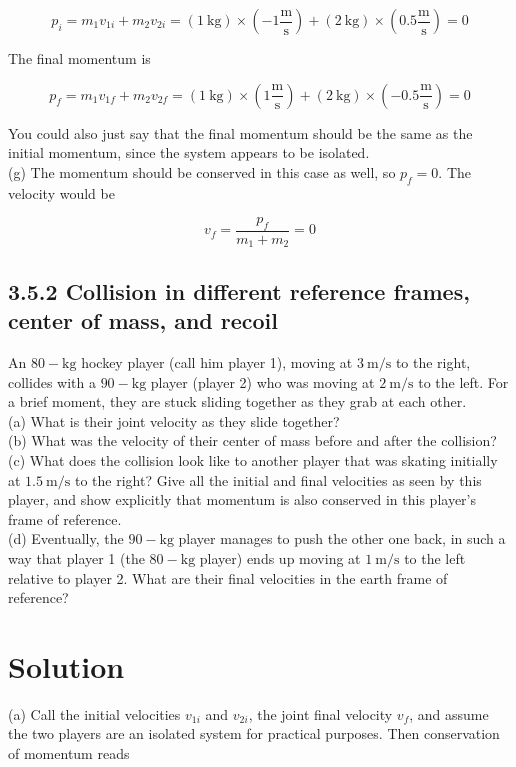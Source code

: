 \documentclass[10pt]{article}
\begin{document}
$$
p_{i}=m_{1} v_{1 i}+m_{2} v_{2 i}=(1 \mathrm{~kg}) \times\left(-1 \frac{\mathrm{m}}{\mathrm{s}}\right)+(2 \mathrm{~kg}) \times\left(0.5 \frac{\mathrm{m}}{\mathrm{s}}\right)=0
$$

The final momentum is

$$
p_{f}=m_{1} v_{1 f}+m_{2} v_{2 f}=(1 \mathrm{~kg}) \times\left(1 \frac{\mathrm{m}}{\mathrm{s}}\right)+(2 \mathrm{~kg}) \times\left(-0.5 \frac{\mathrm{m}}{\mathrm{s}}\right)=0
$$

You could also just say that the final momentum should be the same as the initial momentum, since the system appears to be isolated.\\
(g) The momentum should be conserved in this case as well, so $p_{f}=0$. The velocity would be

$$
v_{f}=\frac{p_{f}}{m_{1}+m_{2}}=0
$$

\subsection*{3.5.2 Collision in different reference frames, center of mass, and recoil}
An $80-\mathrm{kg}$ hockey player (call him player 1), moving at $3 \mathrm{~m} / \mathrm{s}$ to the right, collides with a $90-\mathrm{kg}$ player (player 2) who was moving at $2 \mathrm{~m} / \mathrm{s}$ to the left. For a brief moment, they are stuck sliding together as they grab at each other.\\
(a) What is their joint velocity as they slide together?\\
(b) What was the velocity of their center of mass before and after the collision?\\
(c) What does the collision look like to another player that was skating initially at $1.5 \mathrm{~m} / \mathrm{s}$ to the right? Give all the initial and final velocities as seen by this player, and show explicitly that momentum is also conserved in this player's frame of reference.\\
(d) Eventually, the $90-\mathrm{kg}$ player manages to push the other one back, in such a way that player 1 (the $80-\mathrm{kg}$ player) ends up moving at $1 \mathrm{~m} / \mathrm{s}$ to the left relative to player 2. What are their final velocities in the earth frame of reference?

\section*{Solution}
(a) Call the initial velocities $v_{1 i}$ and $v_{2 i}$, the joint final velocity $v_{f}$, and assume the two players are an isolated system for practical purposes. Then conservation of momentum reads
\end{document}
